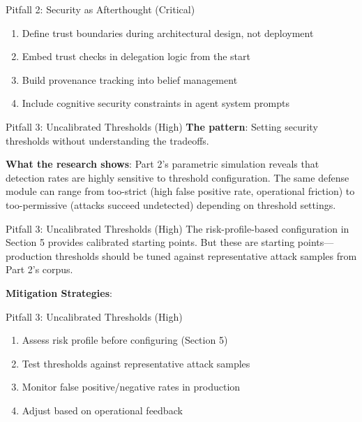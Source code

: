 \documentclass[
  ignorenonframetext,
]{beamer}
\providecommand{\tightlist}{%
  \setlength{\itemsep}{0pt}\setlength{\parskip}{0pt}}
\begin{document}
\begin{frame}[allowframebreaks]{Pitfall 2: Security as Afterthought
(Critical)}
\begin{enumerate}
\tightlist
\item
  Define trust boundaries during architectural design, not deployment
\item
  Embed trust checks in delegation logic from the start
\item
  Build provenance tracking into belief management
\item
  Include cognitive security constraints in agent system prompts
\end{enumerate}
\end{frame}

\begin{frame}[allowframebreaks]{Pitfall 3: Uncalibrated Thresholds
(High)}
\protect{}\label{pitfall-3-uncalibrated-thresholds-high}
\textbf{The pattern}: Setting security thresholds without understanding
the tradeoffs.

\textbf{What the research shows}: Part 2's parametric simulation reveals
that detection rates are highly sensitive to threshold configuration.
The same defense module can range from too-strict (high false positive
rate, operational friction) to too-permissive (attacks succeed
undetected) depending on threshold settings.

\end{frame}

\begin{frame}[allowframebreaks]{Pitfall 3: Uncalibrated Thresholds
(High)}
The risk-profile-based configuration in Section 5 provides calibrated
starting points. But these are starting points---production thresholds
should be tuned against representative attack samples from Part 2's
corpus.

\textbf{Mitigation Strategies}:

\end{frame}

\begin{frame}[allowframebreaks]{Pitfall 3: Uncalibrated Thresholds
(High)}
\begin{enumerate}
\tightlist
\item
  Assess risk profile before configuring (Section 5)
\item
  Test thresholds against representative attack samples
\item
  Monitor false positive/negative rates in production
\item
  Adjust based on operational feedback
\end{enumerate}
\end{frame}
\end{document}
